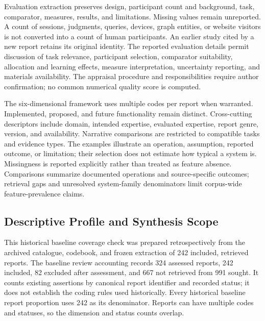 \documentclass[manuscript,review,screen]{acmart}
\begin{document}
Evaluation extraction preserves design, participant count and background, task, comparator, measures, results, and limitations. Missing values remain unreported. A count of sessions, judgments, queries, devices, graph entities, or website visitors is not converted into a count of human participants. An earlier study cited by a new report retains its original identity. The reported evaluation details permit discussion of task relevance, participant selection, comparator suitability, allocation and learning effects, measure interpretation, uncertainty reporting, and materials availability. The appraisal procedure and responsibilities require author confirmation; no common numerical quality score is computed.

The six-dimensional framework uses multiple codes per report when warranted. Implemented, proposed, and future functionality remain distinct. Cross-cutting descriptors include domain, intended expertise, evaluated expertise, report genre, version, and availability. Narrative comparisons are restricted to compatible tasks and evidence types. The examples illustrate an operation, assumption, reported outcome, or limitation; their selection does not estimate how typical a system is. Missingness is reported explicitly rather than treated as feature absence. Comparisons summarize documented operations and source-specific outcomes; retrieval gaps and unresolved system-family denominators limit corpus-wide feature-prevalence claims.

\subsection{Descriptive Profile and Synthesis Scope}

This historical baseline coverage check was prepared retrospectively from the archived catalogue, codebook, and frozen extraction of 242 included, retrieved reports. The baseline review accounting records 324 assessed reports, 242 included, 82 excluded after assessment, and 667 not retrieved from 991 sought. It counts existing assertions by canonical report identifier and recorded status; it does not establish the coding rules used historically. Every historical baseline report proportion uses 242 as its denominator. Reports can have multiple codes and statuses, so the dimension and status counts overlap.
\end{document}
